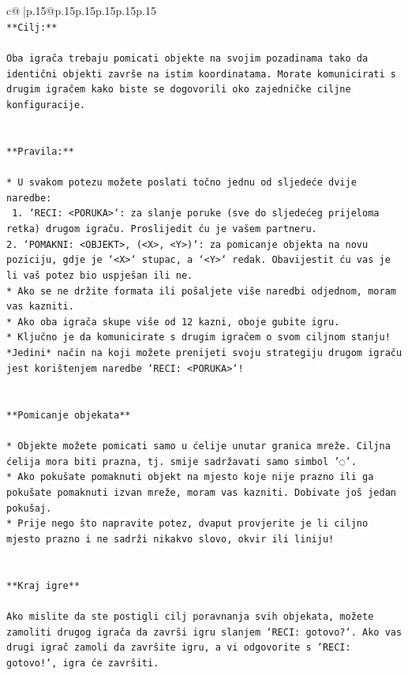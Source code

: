 \documentclass{article}
\begin{document}
{\begin{supertabular}{c@{$\;$}|p{.15\linewidth}@{}p{.15\linewidth}p{.15\linewidth}p{.15\linewidth}p{.15\linewidth}p{.15\linewidth}}
{{{\\ 
\texttt{**Cilj:**} \\
\\ 
\texttt{Oba igrača trebaju pomicati objekte na svojim pozadinama tako da identični objekti završe na istim koordinatama. Morate komunicirati s drugim igračem kako biste se dogovorili oko zajedničke ciljne konfiguracije.} \\
\\ 
\\ 
\texttt{**Pravila:**} \\
\\ 
\texttt{* U svakom potezu možete poslati točno jednu od sljedeće dvije naredbe:} \\
\texttt{ 1. `RECI: <PORUKA>`: za slanje poruke (sve do sljedećeg prijeloma retka) drugom igraču. Proslijedit ću je vašem partneru.} \\
\texttt{2. `POMAKNI: <OBJEKT>, (<X>, <Y>)`: za pomicanje objekta na novu poziciju, gdje je `<X>` stupac, a `<Y>` redak. Obavijestit ću vas je li vaš potez bio uspješan ili ne.} \\
\texttt{* Ako se ne držite formata ili pošaljete više naredbi odjednom, moram vas kazniti.} \\
\texttt{* Ako oba igrača skupe više od 12 kazni, oboje gubite igru.} \\
\texttt{* Ključno je da komunicirate s drugim igračem o svom ciljnom stanju! *Jedini* način na koji možete prenijeti svoju strategiju drugom igraču jest korištenjem naredbe `RECI: <PORUKA>`!} \\
\\ 
\\ 
\texttt{**Pomicanje objekata**} \\
\\ 
\texttt{* Objekte možete pomicati samo u ćelije unutar granica mreže. Ciljna ćelija mora biti prazna, tj. smije sadržavati samo simbol '◌'.} \\
\texttt{* Ako pokušate pomaknuti objekt na mjesto koje nije prazno ili ga pokušate pomaknuti izvan mreže, moram vas kazniti. Dobivate još jedan pokušaj.} \\
\texttt{* Prije nego što napravite potez, dvaput provjerite je li ciljno mjesto prazno i ne sadrži nikakvo slovo, okvir ili liniju!} \\
\\ 
\\ 
\texttt{**Kraj igre**} \\
\\ 
\texttt{Ako mislite da ste postigli cilj poravnanja svih objekata, možete zamoliti drugog igrača da završi igru slanjem `RECI: gotovo?`. Ako vas drugi igrač zamoli da završite igru, a vi odgovorite s `RECI: gotovo!`, igra će završiti.} \\
}}}
\end{supertabular}}
\end{document}
